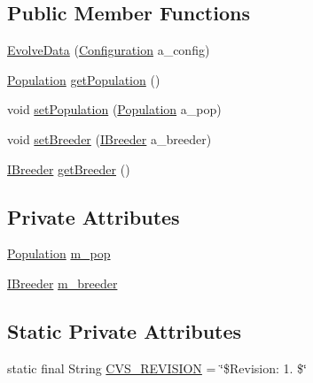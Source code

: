 \subsection*{Public Member Functions}
\begin{DoxyCompactItemize}
\item 
\hyperlink{classorg_1_1jgap_1_1impl_1_1job_1_1_evolve_data_a689a3eb813907e040868b74d06e33eab}{Evolve\-Data} (\hyperlink{classorg_1_1jgap_1_1_configuration}{Configuration} a\-\_\-config)
\item 
\hyperlink{classorg_1_1jgap_1_1_population}{Population} \hyperlink{classorg_1_1jgap_1_1impl_1_1job_1_1_evolve_data_a6b2ab52dcf4e8d25e8afc264e69bb7c4}{get\-Population} ()
\item 
void \hyperlink{classorg_1_1jgap_1_1impl_1_1job_1_1_evolve_data_a7635e54c3128aeba490755a049f81af6}{set\-Population} (\hyperlink{classorg_1_1jgap_1_1_population}{Population} a\-\_\-pop)
\item 
void \hyperlink{classorg_1_1jgap_1_1impl_1_1job_1_1_evolve_data_a1c30edfd595f2fcfdf0ddfe9845e08c6}{set\-Breeder} (\hyperlink{interfaceorg_1_1jgap_1_1_i_breeder}{I\-Breeder} a\-\_\-breeder)
\item 
\hyperlink{interfaceorg_1_1jgap_1_1_i_breeder}{I\-Breeder} \hyperlink{classorg_1_1jgap_1_1impl_1_1job_1_1_evolve_data_a745f84890be8c1d68888c0e8946e9b39}{get\-Breeder} ()
\end{DoxyCompactItemize}
\subsection*{Private Attributes}
\begin{DoxyCompactItemize}
\item 
\hyperlink{classorg_1_1jgap_1_1_population}{Population} \hyperlink{classorg_1_1jgap_1_1impl_1_1job_1_1_evolve_data_a99e01adda240e2093606485be749c4f2}{m\-\_\-pop}
\item 
\hyperlink{interfaceorg_1_1jgap_1_1_i_breeder}{I\-Breeder} \hyperlink{classorg_1_1jgap_1_1impl_1_1job_1_1_evolve_data_ac8aa8a8aae7d28f929d42715f6282bcf}{m\-\_\-breeder}
\end{DoxyCompactItemize}
\subsection*{Static Private Attributes}
\begin{DoxyCompactItemize}
\item 
static final String \hyperlink{classorg_1_1jgap_1_1impl_1_1job_1_1_evolve_data_a9fbd7fcfaa26e03b31328a27d63c4d53}{C\-V\-S\-\_\-\-R\-E\-V\-I\-S\-I\-O\-N} = \char`\"{}\$Revision\-: 1. \$\char`\"{}
\end{DoxyCompactItemize}


